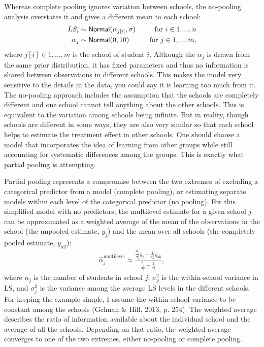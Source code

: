 \documentclass[a4, 12pt]{article}
\begin{document}
Whereas complete pooling ignores variation between schools, the no-pooling analysis overstates it and gives a different mean to each school:
\begin{align*}
LS_i & \sim {\sf Normal} (\alpha_{j[i]}, \sigma) & \quad \text{for } i \in 1,...,n \\
\alpha_{j} & \sim {\sf Normal} (0, 10) & \quad \text{for } j \in 1,...,m,
\end{align*}
where \(j[i] \in 1,...,m\) is the school of student \(i\).
Although the \(\alpha_j\) is drawn from the same prior distribution, it has fixed parameters and thus no information is shared between observations in different schools. This makes the model very sensitive to the details in the data, you could say it is learning too much from it. The no-pooling approach includes the assumption that the schools are completely different and one school cannot tell anything about the other schools. This is equivalent to the variation among schools being infinite. But in reality, though schools are different in some ways, they are also very similar so that each school helps to estimate the treatment effect in other schools. One should choose a model that incorporates the idea of learning from other groups while still accounting for systematic differences among the groups. This is exactly what partial pooling is attempting.

Partial pooling represents a compromise between the two extremes of excluding a categorical predictor from a model (complete pooling), or estimating separate models within each level of the categorical predictor (no pooling). For this simplified model with no predictors, the multilevel estimate for a given school \(j\) can be approximated as a weighted average of the mean of the observations in the school (the unpooled estimate, \(\bar{y}_j\)) and the mean over all schools (the completely pooled estimate, \(\bar{y}_{\mathrm {all}}\)):
\begin{align}\label{eq:weighted_average}
\hat{\alpha}_j^{\mathrm {multilevel}} \approx \frac {\frac{n_j}{\sigma_y^2}\bar y_j + \frac {1}{\sigma_{\alpha}^2}\bar y_{\mathrm {all}}}{\frac {n_j}{\sigma_y^2} + \frac {1}{\sigma_{\alpha}^2}},
\end{align}
where \(n_j\) is the number of students in school \(j\), \(\sigma^2_y\) is the within-school variance in LS, and \(\sigma^2_j\) is the variance among the average LS levels in the different schools. For keeping the example simple, I assume the within-school variance to be constant among the schools (Gelman \& Hill, 2013, p. 254).
The weighted average describes the ratio of information available about the individual school and the average of all the schools. Depending on that ratio, the weighted average converges to one of the two extremes, either no-pooling or complete pooling.
\end{document}
